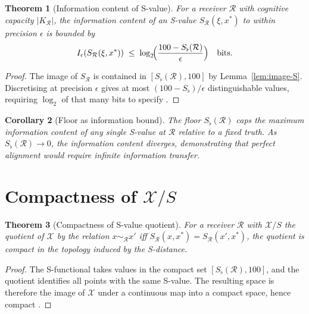\documentclass[twocolumn,11pt,a4paper]{article}
\theoremstyle{thmstyle}
\newtheorem{theorem}{Theorem}[section]
\newtheorem{corollary}[theorem]{Corollary}
\theoremstyle{thmstyle}
\theoremstyle{definition}
\theoremstyle{remark}
\newcommand{\Cands}{\mathcal{X}}
\newcommand{\receiver}{\mathcal{R}}
\newcommand{\Sscalar}{S}
\newcommand{\Sfloor}{S_{\flat}}
\begin{document}
\begin{theorem}[Information content of S-value]
\label{thm:info-content}
For a receiver $\receiver$ with cognitive capacity
$|K_{\receiver}|$, the information content of an
S-value $\Sscalar_{\receiver}(\xi, x^{*})$ to within
precision $\epsilon$ is bounded by
\[
I_{\epsilon}(\Sscalar_{\receiver}(\xi, x^{*}))
\;\leq\; \log_{2}\!\Bigl(\frac{100 - \Sfloor(\receiver)}
                              {\epsilon}\Bigr)
\quad \text{bits}.
\]
\end{theorem}

\begin{proof}
The image of $\Sscalar_{\receiver}$ is contained in
$[\Sfloor(\receiver), 100]$ by
Lemma~\ref{lem:image-S}.  Discretising at precision
$\epsilon$ gives at most $(100 - \Sfloor)/\epsilon$
distinguishable values, requiring $\log_{2}$ of that
many bits to specify \citep{shannon1948,
coverthomas2006}.
\end{proof}

\begin{corollary}[Floor as information bound]
\label{cor:floor-info-bound}
The floor $\Sfloor(\receiver)$ caps the maximum
information content of any single S-value at
$\receiver$ relative to a fixed truth.  As
$\Sfloor(\receiver) \to 0$, the information content
diverges, demonstrating that perfect alignment
would require infinite information transfer.
\end{corollary}

\section{Compactness of $\Cands / \Sscalar$}
\label{sec:compactness-quotient}

\begin{theorem}[Compactness of S-value quotient]
\label{thm:compactness}
For a receiver $\receiver$ with $\Cands / \Sscalar$
the quotient of $\Cands$ by the relation
$x \sim_{\receiver} x'$ iff
$\Sscalar_{\receiver}(x, x^{*}) =
\Sscalar_{\receiver}(x', x^{*})$, the quotient is
compact in the topology induced by the S-distance.
\end{theorem}

\begin{proof}
The S-functional takes values in the compact set
$[\Sfloor(\receiver), 100]$, and the quotient
identifies all points with the same S-value.  The
resulting space is therefore the image of $\Cands$
under a continuous map into a compact space, hence
compact \citep{kelley1955,kuratowski1966}.
\end{proof}
\end{document}
